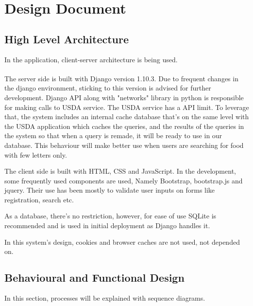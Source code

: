 \section{Design Document}
\subsection{High Level Architecture}

In the application, client-server architecture is being used.\\ \\

The server side is built with Django version 1.10.3. Due to frequent 
changes in the django environment, sticking to this version is advised
for further development. Django API along with "networks" library
in python is responsible for making calls to USDA service. The USDA 
service has a API limit. To leverage that, the system includes an 
internal cache database that's on the same level with the USDA application which caches the queries, and the results of the queries
in the system so that when a query is remade, it will be ready to use
in our database. This behaviour will make better use when users are searching for food with few letters only.

The client side is built with HTML, CSS and JavaScript. In the development, some frequently used components are used, Namely Bootstrap,
bootstrap.js and jquery. Their use has been mostly to validate 
user inputs on forms like registration, search etc.

As a database, there's no restriction, however, for ease of use SQLite
is recommended and is used in initial deployment as Django handles it.

In this system's design, cookies and browser caches are not used,
not depended on.

\subsection{Behavioural and Functional Design}

In this section, processes will be explained with sequence diagrams.


\newpage
